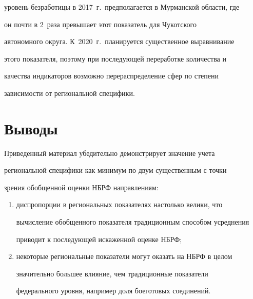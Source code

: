 уровень безработицы в 2017~г.\ предполагается в Мурманской области, где


он почти в 2~раза превышает этот показатель для Чукотского


автономного округа. К~2020~г.\ планируется существенное выравнивание


этого показателя, поэтому при последующей переработке количества и


качества индикаторов возможно перераспределение сфер по степени


зависимости от региональной специфики.





\vspace*{-4pt}





\section{Выводы}





\vspace*{-2pt}





    Приведенный материал убедительно демонстрирует значение учета


региональной специфики как минимум по двум существенным с точки


зрения обобщенной оценки НБРФ направлениям:


\begin{enumerate}[(1)]


\item


диспропорции в региональных показателях настолько велики, что


вычисление обобщенного показателя традиционным способом усреднения


приводит к последующей искаженной оценке НБРФ;\\[-14pt]


\item некоторые региональные показатели могут оказать на НБРФ в целом


значительно большее влияние, чем традиционные показатели


федерального уровня, например доля боеготовых соединений.


\end{enumerate}





